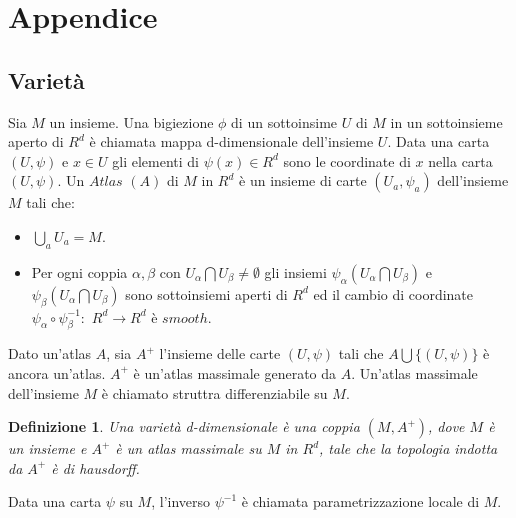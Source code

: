 \documentclass[a4paper, 12pt]{article}
\newtheorem{definition}{Definizione}
\begin{document}
\section{Appendice}
\subsection{Varietà}
Sia $M$ un insieme. Una bigiezione $\phi$ di un sottoinsime $U$ di $M$ in un sottoinsieme aperto di $R^d$ è chiamata mappa d-dimensionale dell'insieme $U$. Data una carta $(U, \psi)$ e $x \in U$ gli elementi di $\psi(x) \in R^d$ sono le coordinate di $x$ nella carta $(U, \psi)$. Un $Atlas$ $(A)$ di $M$ in $R^d$ è un insieme di carte $(U_a, \psi_a)$ dell'insieme $M$ tali che:
\begin{itemize}
    \item $\bigcup_a U_a = M$.
    \item Per ogni coppia $\alpha, \beta$ con $U_{\alpha} \bigcap U_{\beta} \neq \emptyset$ gli insiemi $\psi_{\alpha}(U_{\alpha} \bigcap U_{\beta})$ e $\psi_{\beta}(U_{\alpha} \bigcap U_{\beta})$ sono sottoinsiemi aperti di $R^d$ ed il cambio di coordinate $\psi_{\alpha} \circ \psi_{\beta}^{-1}:$ $R^d \to R^d$ è $smooth$.
\end{itemize}
Dato un'atlas $A$, sia $A^+$ l'insieme delle carte $(U, \psi)$ tali che $A \bigcup \{(U, \psi)\}$ è ancora un'atlas. $A^+$ è un'atlas massimale generato da $A$. Un'atlas massimale dell'insieme $M$ è chiamato struttra differenziabile su $M$.
\begin{definition}
Una varietà d-dimensionale è una coppia $(M, A^+)$, dove $M$ è un insieme e $A^+$ è un atlas massimale su $M$ in $R^d$, tale che la topologia indotta da $A^+$ è di hausdorff.
\end{definition}
Data una carta $\psi$ su $M$, l'inverso $\psi^{-1}$ è chiamata parametrizzazione locale di $M$.
\end{document}
